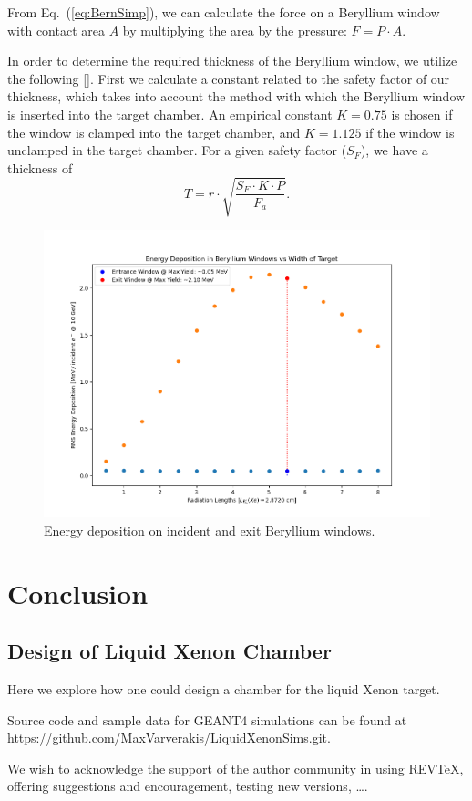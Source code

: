 \documentclass[%
reprint,
amsmath, amssymb,
aps,
floatfix,
]{revtex4-2}
\begin{document}
From Eq.~(\ref{eq:BernSimp}), we can calculate the force on a Beryllium window with contact area $A$ by 
multiplying the area by the pressure: $F = P\cdot A$.

In order to determine the required thickness of the Beryllium window, we utilize the following [].
First we calculate a constant related to the safety factor of our thickness, which takes into account
the method with which the Beryllium window is inserted into the target chamber.
An empirical constant $K = 0.75$ is chosen if the window is clamped into the target chamber, and
$K = 1.125$ if the window is unclamped in the target chamber.  For a given safety factor ($S_F$),
we have a thickness of
\begin{equation}
    T = r\cdot\sqrt{\frac{S_F\cdot K\cdot P}{F_a}}.
\end{equation}

\begin{figure}[H]
    \includegraphics[width = .5\textwidth]{../images/WindowDeps.png}
    \caption{\label{fig:WinDeps}Energy deposition on incident and exit Beryllium windows.}
\end{figure}

\section{Conclusion}
\subsection{Design of Liquid Xenon Chamber}
Here we explore how one could design a chamber for the liquid Xenon target.

Source code and sample data for GEANT4 simulations can be found at 
\url{https://github.com/MaxVarverakis/LiquidXenonSims.git}.










\begin{acknowledgments}
We wish to acknowledge the support of the author community in using
REV\TeX{}, offering suggestions and encouragement, testing new versions,
\dots.
\end{acknowledgments}
\end{document}
